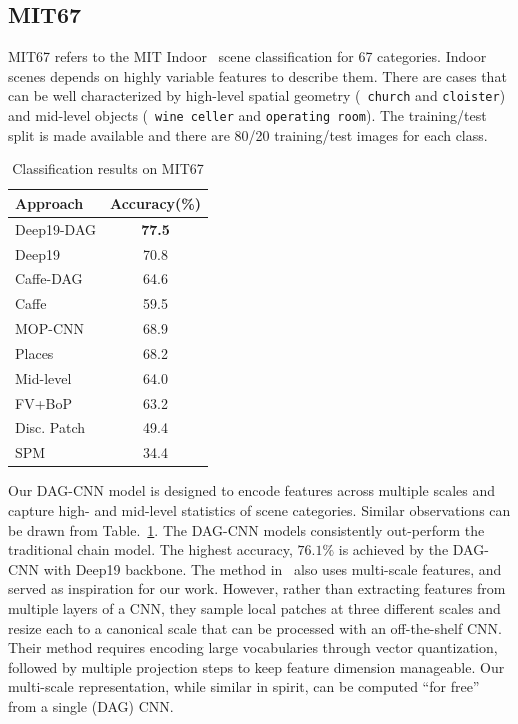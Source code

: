 \documentclass[10pt,twocolumn,letterpaper]{article}
\begin{document}
\subsection{MIT67}

MIT67 refers to the MIT Indoor~\cite{MIT67} scene classification for 67 categories. Indoor scenes depends on highly variable features to describe them. There are cases that can be well characterized by high-level spatial geometry (\eg~{\tt church} and {\tt cloister}) and mid-level objects (\eg~{\tt wine celler} and {\tt operating room}). The training/test split is made available and there are 80/20 training/test images for each class.

\begin{table}[htbp]
\begin{center}
\begin{tabular}{|l|c|}
\hline
Approach & Accuracy(\%) \\
\hline
Deep19-DAG & \textbf{77.5} \\
Deep19~\cite{veryDeep} & 70.8 \\
Caffe-DAG & 64.6	\\
Caffe~\cite{Caffe} & 59.5 \\ \hline
MOP-CNN~\cite{Gong14} & 68.9 \\
Places~\cite{zhoulearning}	& 68.2	\\
Mid-level~\cite{mid_level} & 64.0	\\
FV+BoP~\cite{FV_BoP} & 63.2 \\
Disc. Patch~\cite{disc_patch} & 49.4 \\
SPM~\cite{spatial_pyramid} & 34.4	\\
\hline
\end{tabular}
\end{center}
\caption{Classification results on MIT67}
\label{table:MIT67}
\end{table}

Our DAG-CNN model is designed to encode features across multiple scales and capture high- and mid-level statistics of scene categories. Similar observations can be drawn from Table.~\ref{table:MIT67}. The DAG-CNN models consistently out-perform the traditional chain model. The highest accuracy, $76.1\%$ is achieved by the DAG-CNN with Deep19 backbone. The method in~\cite{Gong14} also uses multi-scale features, and served as inspiration for our work. However, rather than extracting features from multiple layers of a CNN, they sample local patches at three different scales and resize each to a canonical scale that can be processed with an off-the-shelf CNN. Their method requires encoding large vocabularies through vector quantization, followed by multiple projection steps to keep feature dimension manageable. Our multi-scale representation, while similar in spirit, can be computed ``for free'' from a single (DAG) CNN.
\end{document}
